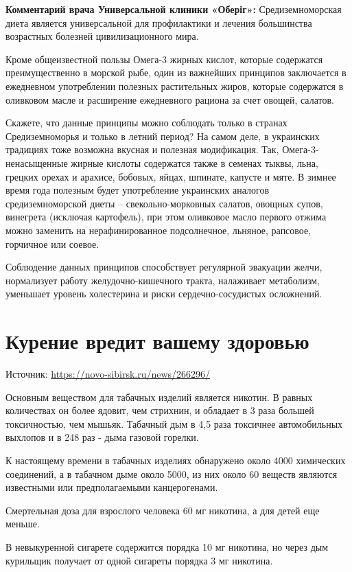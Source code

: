 \textbf{Комментарий врача Универсальной клиники «Оберіг»:} Средиземноморская диета является универсальной для профилактики и лечения большинства возрастных болезней цивилизационного мира.

Кроме общеизвестной пользы Омега-3 жирных кислот, которые содержатся преимущественно в морской рыбе, один из важнейших принципов заключается в ежедневном употреблении полезных растительных жиров, которые содержатся в оливковом масле и расширение ежедневного рациона за счет овощей, салатов.

Скажете, что данные принципы можно соблюдать только в странах Средиземноморья и только в летний период? На самом деле, в украинских традициях тоже возможна вкусная и полезная модификация. Так, Омега-3-ненасыщенные жирные кислоты содержатся также в семенах тыквы, льна, грецких орехах и арахисе, бобовых, яйцах, шпинате, капусте и мяте. В зимнее время года полезным будет употребление украинских аналогов средиземноморской диеты – свекольно-морковных салатов, овощных супов, винегрета (исключая картофель), при этом оливковое масло первого отжима можно заменить на нерафинированное подсолнечное, льняное, рапсовое, горчичное или соевое.


Соблюдение данных принципов способствует регулярной эвакуации желчи, нормализует работу желудочно-кишечного тракта, налаживает метаболизм, уменьшает уровень холестерина и риски сердечно-сосудистых осложнений.




\section{Курение вредит вашему здоровью}
Источник: \url{https://novo-sibirsk.ru/news/266296/}

Основным веществом для табачных изделий является никотин. В равных количествах он более ядовит, чем стрихнин, и обладает в 3 раза большей токсичностью, чем мышьяк. Табачный дым в 4,5 раза токсичнее автомобильных выхлопов и в 248 раз - дыма газовой горелки.

К настоящему времени в табачных изделиях обнаружено около 4000 химических соединений, а в табачном дыме около 5000, из них около 60 веществ являются известными или предполагаемыми канцерогенами.

Смертельная доза для взрослого человека 60 мг никотина, а для детей еще меньше.

В невыкуренной сигарете содержится порядка 10 мг никотина, но через дым курильщик получает от одной сигареты порядка 3 мг никотина.

